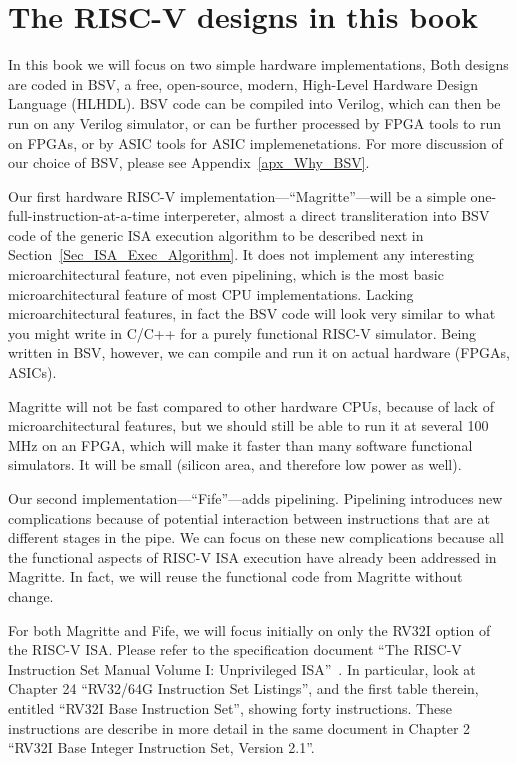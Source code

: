 
\section{The RISC-V designs in this book}

In this book we will focus on two simple hardware implementations,
Both designs are coded in BSV, a free, open-source, modern, High-Level
Hardware Design Language (HLHDL).  BSV code can be compiled into
Verilog, which can then be run on any Verilog simulator, or can be
further processed by FPGA tools to run on FPGAs, or by ASIC tools for
ASIC implemenetations.  For more discussion of our choice of BSV,
please see Appendix~\ref{apx_Why_BSV}.

Our first hardware RISC-V implementation---``Magritte''---will be a
simple one-full-instruction-at-a-time interpereter, almost a direct
transliteration into BSV code of the generic ISA execution algorithm
to be described next in Section~\ref{Sec_ISA_Exec_Algorithm}.  It does
not implement any interesting microarchitectural feature, not even
pipelining, which is the most basic microarchitectural feature of most
CPU implementations.  Lacking microarchitectural features, in fact the
BSV code will look very similar to what you might write in C/C++ for a
purely functional RISC-V simulator.  Being written in BSV, however, we
can compile and run it on actual hardware (FPGAs, ASICs).

Magritte will not be fast compared to other hardware CPUs, because of
lack of microarchitectural features, but we should still be able to
run it at several 100 MHz on an FPGA, which will make it faster than
many software functional simulators.  It will be small (silicon area,
and therefore low power as well).

Our second implementation---``Fife''---adds pipelining.  Pipelining
introduces new complications because of potential interaction between
instructions that are at different stages in the pipe.  We can focus
on these new complications because all the functional aspects of
RISC-V ISA execution have already been addressed in Magritte.  In
fact, we will reuse the functional code from Magritte without change.

For both Magritte and Fife, we will focus initially on only the RV32I
option of the RISC-V ISA.  Please refer to the specification document
``The RISC-V Instruction Set Manual Volume I: Unprivileged
ISA''~\cite{RISCV_Unpriv_2019_12_13}.  In particular, look at Chapter
24 ``RV32/64G Instruction Set Listings'', and the first table therein,
entitled ``RV32I Base Instruction Set'', showing forty instructions.
These instructions are describe in more detail in the same document in
Chapter 2 ``RV32I Base Integer Instruction Set, Version 2.1''.

